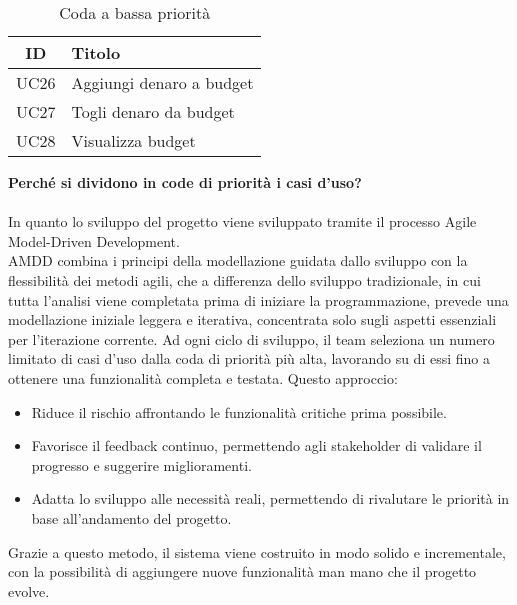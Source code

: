 \begin{table}[H]
   \centering
   \begin{tabular}{|c|p{10cm}|}
       \hline
       \textbf{ID} & \textbf{Titolo} \\ \hline
       UC26 & Aggiungi denaro a budget \\ \hline
       UC27 & Togli denaro da budget \\ \hline
       UC28 & Visualizza budget \\ \hline
   \end{tabular}
   \caption{Coda a bassa priorità}
\end{table}


\textbf{Perché si dividono in code di priorità i casi d'uso?}
\\
\\
In quanto lo sviluppo del progetto viene sviluppato tramite il processo Agile Model-Driven Development.
\\
AMDD combina i principi della modellazione guidata dallo sviluppo con la flessibilità dei metodi agili, che a differenza dello sviluppo tradizionale, in cui tutta l’analisi viene completata prima di iniziare la programmazione, prevede una modellazione iniziale leggera e iterativa, concentrata solo sugli aspetti essenziali per l’iterazione corrente.
\newline
Ad ogni ciclo di sviluppo, il team seleziona un numero limitato di casi d’uso dalla coda di priorità più alta, lavorando su di essi fino a ottenere una funzionalità completa e testata. Questo approccio:
\begin{itemize}
    \item Riduce il rischio affrontando le funzionalità critiche prima possibile.
    \item Favorisce il feedback continuo, permettendo agli stakeholder di validare il progresso e suggerire miglioramenti.
    \item Adatta lo sviluppo alle necessità reali, permettendo di rivalutare le priorità in base all’andamento del progetto.
\end{itemize}
Grazie a questo metodo, il sistema viene costruito in modo solido e incrementale, con la possibilità di aggiungere nuove funzionalità man mano che il progetto evolve.